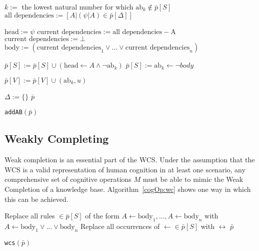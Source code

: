 \begin{algorithm}[H] \label{cogOp:addAB}
\SetAlgoLined
{}
{
{
$k:=$ the lowest natural number for which $\text{ab}_k \notin \bar{p}[S]$\;
$\text{all dependencies}:= [A | (\psi|A) \in \bar{p}[\Delta]]$\;

{
$\text{head}:=\psi$\;
$\text{current dependencies}:= \text{all dependencies} - \text{A}$\;
{
$\text{current dependencies}:=\bot$\;
}
$\text{body}:=(\text{current dependencies}_1 \lor ... \lor \text{current dependencies}_n)$\;

$\bar{p}[S]:= \bar{p}[S] \cup (\text{head} \leftarrow A \land \lnot \text{ab}_k)$\;
$\bar{p}[S]:= \text{ab}_k \leftarrow \lnot body$\;

}
$\bar{p}[V]:= \bar{p}[V] \cup (\text{ab}_k,u)$\;
}
$\Delta:=\{\}$\;
\Return $\bar{p}$
}
\caption{\texttt{addAB}$(\bar{p})$}
\end{algorithm}

\subsection{Weakly Completing}


Weak completion is an essential part of the WCS. Under the assumption that the WCS is a valid representation of human cognition in at least one scenario, any comprehensive set of cognitive operations $M$ must be able to mimic the Weak Completion of a knowledge base. Algorithm~\ref{cogOp:wc} shows one way in which this can be achieved.

\begin{algorithm}[H] \label{cogOp:wcs}
\SetAlgoLined
{}
{
Replace all rules $\in \bar{p}[S]$ of the form $A\leftarrow \text{body}_1,...,A\leftarrow \text{body}_n$ with $A\leftarrow \text{body}_1 \lor ... \lor \text{body}_n$ \;
Replace all occurrences of $\leftarrow \in \bar{p}[S]$ with $\leftrightarrow$ \;
\Return $\bar{p}$
}

\caption{\texttt{wcs}$(\bar{p})$}
\end{algorithm}



